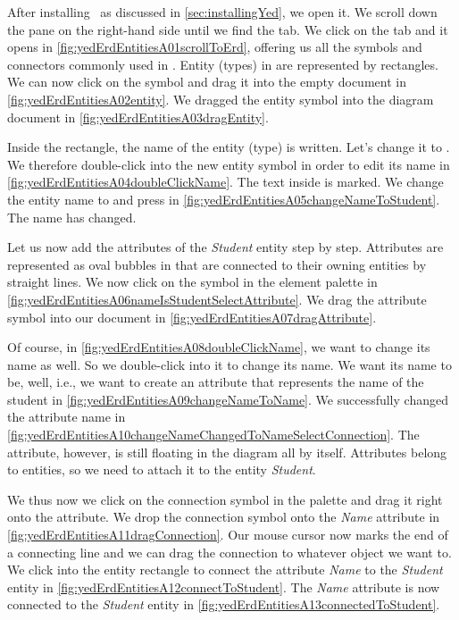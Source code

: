 After installing \yEd\ as discussed in \cref{sec:installingYed}, we open it.
We scroll down the  pane on the right-hand side until we find the  tab.
We click on the tab and it opens in \cref{fig:yedErdEntitiesA01scrollToErd}, offering us all the symbols and connectors commonly used in .
Entity (types) in  are represented by rectangles.
We can now click on the  symbol and drag it into the empty document in \cref{fig:yedErdEntitiesA02entity}.
We dragged the entity symbol into the diagram document in \cref{fig:yedErdEntitiesA03dragEntity}.

Inside the rectangle, the name of the entity (type) is written.
Let's change it to .
We therefore double-click into the new entity symbol in order to edit its name in \cref{fig:yedErdEntitiesA04doubleClickName}.
The text inside is marked.
We change the entity name to  and press \keys{\enter} in \cref{fig:yedErdEntitiesA05changeNameToStudent}.
The name has changed.

Let us now add the attributes of the \emph{Student} entity step by step.
Attributes are represented as oval bubbles in  that are connected to their owning entities by straight lines.
We now click on the  symbol in the element palette in \cref{fig:yedErdEntitiesA06nameIsStudentSelectAttribute}.
We drag the attribute symbol into our document in \cref{fig:yedErdEntitiesA07dragAttribute}.

Of course, in \cref{fig:yedErdEntitiesA08doubleClickName}, we want to change its name as well.
So we double-click into it to change its name.
We want its name to be, well,  i.e., we want to create an attribute that represents the name of the student in \cref{fig:yedErdEntitiesA09changeNameToName}.
We successfully changed the attribute name in \cref{fig:yedErdEntitiesA10changeNameChangedToNameSelectConnection}.
The attribute, however, is still floating in the diagram all by itself.
Attributes belong to entities, so we need to attach it to the entity \emph{Student}.

We thus now we click on the connection symbol in the palette and drag it right onto the attribute.
We drop the connection symbol onto the \emph{Name} attribute in \cref{fig:yedErdEntitiesA11dragConnection}.
Our mouse cursor now marks the end of a connecting line and we can drag the connection to whatever object we want to.
We click into the entity rectangle to connect the attribute \emph{Name} to the \emph{Student} entity in \cref{fig:yedErdEntitiesA12connectToStudent}.
The \emph{Name} attribute is now connected to the \emph{Student} entity in \cref{fig:yedErdEntitiesA13connectedToStudent}.

